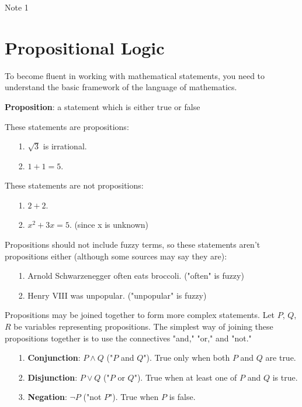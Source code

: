 \documentclass[12pt,a4paper]{article}
\author{Henry Yu}
\begin{document}
\raggedright

\begin{center}
	\huge{Note 1}
\end{center}

\section*{Propositional Logic}

To become fluent in working with mathematical statements, you need to understand the basic framework of the language of mathematics.

\bigbreak

\textbf{Proposition}: a statement which is either true or false

\bigbreak

These statements are propositions:
\begin{itemize}
	\item[1.] $\sqrt{3}$ is irrational.
	\item[2.]$1+1=5$.
\end{itemize}

These statements are not propositions:
\begin{itemize}
	\item[1.] $2+2$.
	\item[2.]$x^2+3x=5$. (since x is unknown)
\end{itemize}

Propositions should not include fuzzy terms, so these statements aren't propositions either (although some sources may say they are):
\begin{itemize}
	\item[1.] Arnold Schwarzenegger often eats broccoli. ("often" is fuzzy)
	\item[2.] Henry VIII was unpopular. ("unpopular" is fuzzy)
\end{itemize}

Propositions may be joined together to form more complex statements. Let $P$, $Q$,  $R$ be variables representing propositions. The simplest way of joining these propositions together is to use the connectives "and," "or," and "not."
\begin{itemize}
	\item[1.] \textbf{Conjunction}: $P\wedge Q$ ("$P$ and $Q$"). True only when both $P$ and $Q$ are true.
	\item[2.] \textbf{Disjunction}: $P\vee Q$ ("$P$ or $Q$"). True when at least one of $P$ and $Q$ is true.
	\item[3.] \textbf{Negation}: $\neg P$ ("not $P$"). True when $P$ is false.
\end{itemize}
\end{document}
